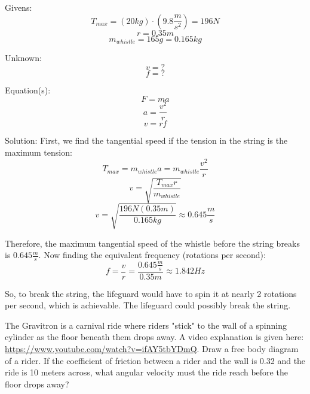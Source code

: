 \begin{Answer}[ref = whistle]
Givens:
$$T_{max} = \left( 20 kg \right) \cdot \left( 9.8 \frac{m}{s^2} \right) = 196 N$$
$$r = 0.35 m$$
$$m_{whistle} = 165 g = 0.165 kg$$

Unknown:
$$v = ?$$
$$f = ?$$

Equation(s):
$$F = ma$$
$$a = \frac{v^2}{r}$$
$$v = rf$$

Solution:
First, we find the tangential speed if the tension in the string is the maximum tension:
$$T_{max} = m_{whistle}a = m_{whistle} \frac{v^2}{r}$$
$$v = \sqrt{\frac{T_{max}r}{m_{whistle}}}$$
$$v = \sqrt{\frac{196 N \left(0.35 m \right)}{0.165 kg}} \approx 0.645 \frac{m}{s}$$

Therefore, the maximum tangential speed of the whistle before the string breaks is $0.645 \frac{m}{s}$. Now finding the equivalent frequency (rotations per second):
$$f = \frac{v}{r} = \frac{0.645 \frac{m}{s}}{0.35 m} \approx 1.842 Hz$$

So, to break the string, the lifeguard would have to spin it at nearly 2 rotations per second, which is achievable. The lifeguard could possibly break the string. 
\end{Answer}

\begin{Exercise}[title = {The Gravitron}, label = gravitron]
The Gravitron is a carnival ride where riders "stick" to the wall of a spinning cylinder as the floor beneath them drops away. A video explanation is given here: \url{https://www.youtube.com/watch?v=ifAY5tbYDmQ}. Draw a free body diagram of a rider. If the coefficient of friction between a rider and the wall is 0.32 and the ride is 10 meters across, what angular velocity must the ride reach before the floor drops away?
\end{Exercise}

